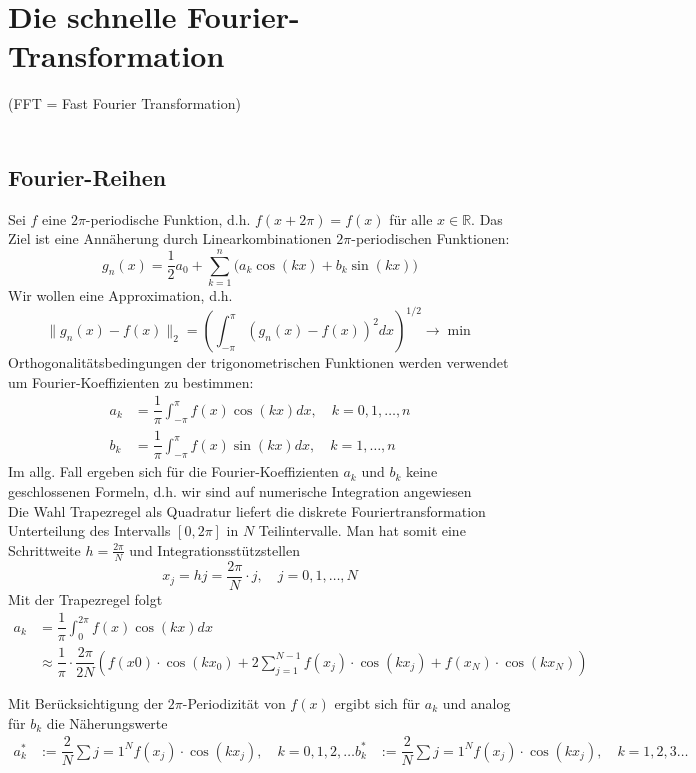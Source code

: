 
\section{Die schnelle Fourier-Transformation}
(FFT = Fast Fourier Transformation) \\ \\
\subsection{Fourier-Reihen}
Sei $f$ eine $2\pi$-periodische Funktion, d.h. $f(x+2\pi)=f(x)$ für alle $x\in\mathbb{R}$. Das Ziel ist eine 
Annäherung durch Linearkombinationen $2\pi$-periodischen Funktionen:
\[
    g_n(x) = \dfrac{1}{2}a_0 + \sum_{k=1}^{n}\Big(a_k\cos(kx)+b_k\sin(kx)\Big)
\]
Wir wollen eine Approximation, d.h.
\[
    \|g_n(x)-f(x)\|_2 = \left(\int_{-\pi}^{\pi} (g_n(x)-f(x))^2 dx\right)^{1/2} \to \min
\]
Orthogonalitätsbedingungen der trigonometrischen Funktionen werden verwendet um Fourier-Koeffizienten zu bestimmen:
\begin{align*}
    a_k &= \dfrac{1}{\pi} \int_{-\pi}^{\pi} f(x)\cos(kx) dx, \quad k=0,1,\dots,n \\
    b_k &= \dfrac{1}{\pi} \int_{-\pi}^{\pi} f(x)\sin(kx) dx, \quad k=1,\dots,n 
\end{align*}
Im allg. Fall ergeben sich für die Fourier-Koeffizienten $a_k$ und $b_k$  keine geschlossenen Formeln, d.h. wir 
sind auf numerische Integration angewiesen \\
Die Wahl Trapezregel als Quadratur liefert die diskrete Fouriertransformation \\
Unterteilung des Intervalls $[0,2\pi]$ in $N$ Teilintervalle. Man hat somit eine Schrittweite $h=\tfrac{2\pi}{N}$ und 
Integrationsstützstellen 
\[
    x_j = hj = \dfrac{2\pi}{N}\cdot j, \quad j=0,1,\dots,N
\]
Mit der Trapezregel folgt 
\begin{align*}
    a_k &= \dfrac{1}{\pi} \int_0^{2\pi} f(x) \cos(kx) dx \\
    &\approx\dfrac{1}{\pi} \cdot \dfrac{2\pi}{2N}\left(f(x0)\cdot\cos(kx_0) 
    + 2\sum_{j=1}^{N-1} f(x_j)\cdot\cos(kx_j) + f(x_N)\cdot \cos(kx_N)\right)
\end{align*}

Mit Berücksichtigung der $2\pi$-Periodizität von $f(x)$ ergibt sich für $a_k$ und analog für $b_k$ die Näherungswerte
\begin{align*}
    a_k^* &:= \dfrac{2}{N}\sum{j=1}^N f(x_j)\cdot \cos(kx_j), \quad k=0,1,2,\dots
    b_k^* &:= \dfrac{2}{N}\sum{j=1}^N f(x_j)\cdot \cos(kx_j), \quad k=1,2,3\dots
\end{align*}

